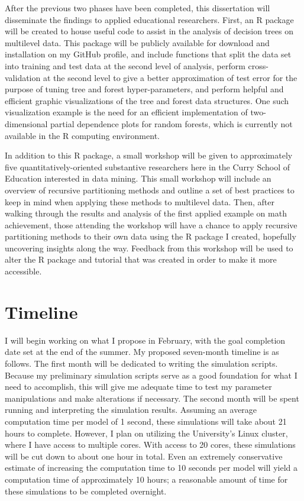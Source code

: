 	After the previous two phases have been completed, this dissertation will disseminate the findings to applied educational researchers. First, an R package will be created to house useful code to assist in the analysis of decision trees on multilevel data. This package will be publicly available for download and installation on my GitHub profile, and include functions that split the data set into training and test data at the second level of analysis, perform cross-validation at the second level to give a better approximation of test error for the purpose of tuning tree and forest hyper-parameters, and perform helpful and efficient graphic visualizations of the tree and forest data structures. One such visualization example is the need for an efficient implementation of two-dimensional partial dependence plots for random forests, which is currently not available in the R computing environment. 


	In addition to this R package, a small workshop will be given to approximately five quantitatively-oriented substantive researchers here in the Curry School of Education interested in data mining. This small workshop will include an overview of recursive partitioning methods and outline a set of best practices to keep in mind when applying these methods to multilevel data. Then, after walking through the results and analysis of the first applied example on math achievement, those attending the workshop will have a chance to apply recursive partitioning methods to their own data using the R package I created, hopefully uncovering insights along the way. Feedback from this workshop will be used to alter the R package and tutorial that was created in order to make it more accessible.



\section{Timeline}

	I will begin working on what I propose in February, with the goal completion date set at the end of the summer. My proposed seven-month timeline is as follows. The first month will be dedicated to writing the simulation scripts. Because my preliminary simulation scripts serve as a good foundation for what I need to accomplish, this will give me adequate time to test my parameter manipulations and make alterations if necessary. The second month will be spent running and interpreting the simulation results. Assuming an average computation time per model of 1 second, these simulations will take about 21 hours to complete. However, I plan on utilizing the University's Linux cluster, where I have access to multiple cores. With access to 20 cores, these simulations will be cut down to about one hour in total. Even an extremely conservative estimate of increasing the computation time to 10 seconds per model will yield a computation time of approximately 10 hours; a reasonable amount of time for these simulations to be completed overnight.



